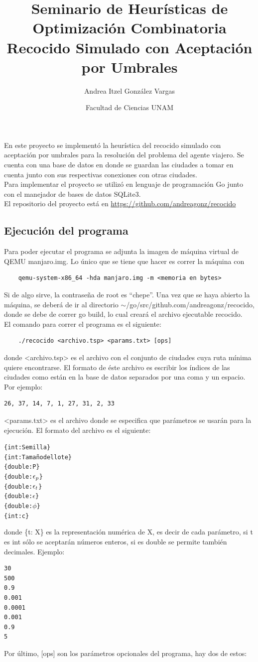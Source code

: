 \documentclass[12pt]{article}
\title{Seminario de Heurísticas de Optimización Combinatoria \\ Recocido Simulado con Aceptación por Umbrales}
\author{Andrea Itzel González Vargas}
\date{Facultad de Ciencias UNAM}
\begin{document}
\maketitle
En este proyecto se implementó la heurística del recocido simulado con aceptación por umbrales para la resolución del problema del agente viajero. Se cuenta con una base de datos en donde se guardan las ciudades a tomar en cuenta junto con sus respectivas conexiones con otras ciudades. \\
Para implementar el proyecto se utilizó en lenguaje de programación Go junto con el manejador de bases de datos SQLite3. \\
El repositorio del proyecto está en \url{https://github.com/andreagonz/recocido}
\subsection{Ejecución del programa}
Para poder ejecutar el programa se adjunta la imagen de máquina virtual de QEMU \textsf{manjaro.img}. Lo único que se tiene que hacer es correr la máquina con
\begin{verbatim}
    qemu-system-x86_64 -hda manjaro.img -m <memoria en bytes>
\end{verbatim}
Si de algo sirve, la contraseña de root es ``chepe''.
Una vez que se haya abierto la máquina, se deberá de ir al directorio \textsf{$\sim$/go/src/github.com/andreagonz/recocido}, donde se debe de correr \textsf{go build}, lo cual creará el archivo ejecutable \textsf{recocido}. \\
El comando para correr el programa es el siguiente:
\begin{verbatim}
    ./recocido <archivo.tsp> <params.txt> [ops]
\end{verbatim}
donde \textsf{<archivo.tsp>} es el archivo con el conjunto de ciudades cuya ruta mínima quiere encontrarse. El formato de éste archivo es escribir los índices de las ciudades como están en la base de datos separados por una coma y un espacio. Por ejemplo:
\begin{verbatim}
26, 37, 14, 7, 1, 27, 31, 2, 33
\end{verbatim}
\textsf{<params.txt>} es el archivo donde se especifica que parámetros se usarán para la ejecución. El formato del archivo es el siguiente:
\begin{alltt}
\{int: Semilla\}
\{int: Tamaño del lote\}
\{double: P\}
\{double: \(\epsilon\sb{p}\)\}
\{double: \(\epsilon\sb{t}\)\}
\{double: \(\epsilon\)\}
\{double: \(\phi\)\}
\{int: c\}
\end{alltt}
donde \textsf{\{t: X\}} es la representación numérica de \textsf{X}, es decir de cada parámetro, si \textsf{t} es \textsf{int} sólo se aceptarán números enteros, si es \textsf{double} se permite también decimales. Ejemplo:
\begin{verbatim}
30
500
0.9
0.001
0.0001
0.001
0.9
5
\end{verbatim}
Por último, \textsf{[ops]} son los parámetros opcionales del programa, hay dos de estos: \\
\end{document}

